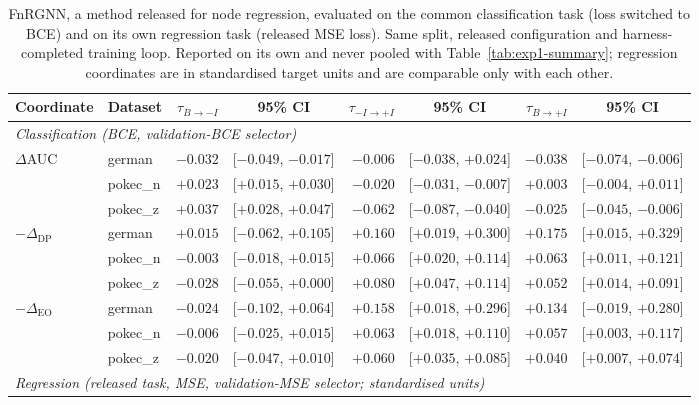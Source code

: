 \begin{table}[t]
\centering
\caption{FnRGNN, a method released for node regression, evaluated on the common classification task (loss switched to BCE) and on its own regression task (released MSE loss). Same split, released configuration and harness-completed training loop. Reported on its own and never pooled with Table~\ref{tab:exp1-summary}; regression coordinates are in standardised target units and are comparable only with each other.}
\label{tab:exp1-1-fnrgnn}
\vspace{-0.2cm}
\scriptsize
\begin{tabular}{llrcrcrc}
\toprule
Coordinate & Dataset & $\tau_{B\rightarrow -I}$ & 95\% CI & $\tau_{-I\rightarrow +I}$ & 95\% CI & $\tau_{B\rightarrow +I}$ & 95\% CI \\
\midrule
\multicolumn{8}{l}{\textit{Classification (BCE, validation-BCE selector)}} \\
$\Delta$AUC & german & $-0.032$ & [$-0.049$, $-0.017$] & $-0.006$ & [$-0.038$, $+0.024$] & $-0.038$ & [$-0.074$, $-0.006$] \\
 & pokec\_n & $+0.023$ & [$+0.015$, $+0.030$] & $\mathbf{-0.020}$ & [$-0.031$, $-0.007$] & $+0.003$ & [$-0.004$, $+0.011$] \\
 & pokec\_z & $+0.037$ & [$+0.028$, $+0.047$] & $\mathbf{-0.062}$ & [$-0.087$, $-0.040$] & $-0.025$ & [$-0.045$, $-0.006$] \\
\cmidrule(l){1-8}
$-\Delta_{\mathrm{DP}}$ & german & $+0.015$ & [$-0.062$, $+0.105$] & $\mathbf{+0.160}$ & [$+0.019$, $+0.300$] & $+0.175$ & [$+0.015$, $+0.329$] \\
 & pokec\_n & $-0.003$ & [$-0.018$, $+0.015$] & $\mathbf{+0.066}$ & [$+0.020$, $+0.114$] & $+0.063$ & [$+0.011$, $+0.121$] \\
 & pokec\_z & $-0.028$ & [$-0.055$, $+0.000$] & $\mathbf{+0.080}$ & [$+0.047$, $+0.114$] & $+0.052$ & [$+0.014$, $+0.091$] \\
\cmidrule(l){1-8}
$-\Delta_{\mathrm{EO}}$ & german & $-0.024$ & [$-0.102$, $+0.064$] & $\mathbf{+0.158}$ & [$+0.018$, $+0.296$] & $+0.134$ & [$-0.019$, $+0.280$] \\
 & pokec\_n & $-0.006$ & [$-0.025$, $+0.015$] & $\mathbf{+0.063}$ & [$+0.018$, $+0.110$] & $+0.057$ & [$+0.003$, $+0.117$] \\
 & pokec\_z & $-0.020$ & [$-0.047$, $+0.010$] & $\mathbf{+0.060}$ & [$+0.035$, $+0.085$] & $+0.040$ & [$+0.007$, $+0.074$] \\
\midrule
\multicolumn{8}{l}{\textit{Regression (released task, MSE, validation-MSE selector; standardised units)}} \\

\end{tabular}
\end{table}
